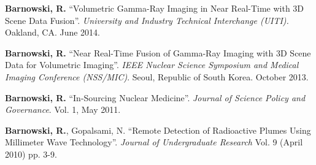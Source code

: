 \documentclass[margin,line]{res}
\begin{document}
\begin{resume}
{\bf Barnowski, R.} ``Volumetric Gamma-Ray Imaging in Near Real-Time with 3D
Scene Data Fusion''. {\it University and Industry Technical Interchange (UITI).}
Oakland, CA. June 2014.

{\bf Barnowski, R.} ``Near Real-Time Fusion of Gamma-Ray Imaging with 3D Scene
Data for Volumetric Imaging''. {\it IEEE Nuclear Science Symposium and
Medical Imaging Conference (NSS/MIC)}. Seoul, Republic of South Korea. October
2013.

{\bf Barnowski, R.} ``In-Sourcing Nuclear Medicine''. {\it Journal of Science
Policy and Governance}. Vol. 1, May 2011.

{\bf Barnowski, R.}, Gopalsami, N. ``Remote Detection of Radioactive Plumes
Using Millimeter Wave Technology''. {\it Journal of Undergraduate Research} 
Vol. 9 (April 2010) pp. 3-9.


\end{resume}
\end{document}
